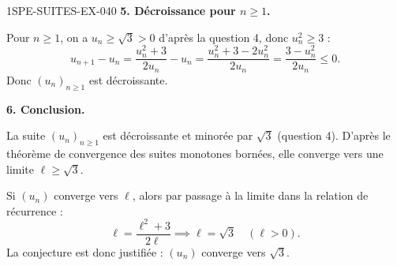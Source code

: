 \begin{corrige}{1SPE-SUITES-EX-040}
\textbf{5. Décroissance pour $n \geq 1$.}

Pour $n \geq 1$, on a $u_n \geq \sqrt{3} > 0$ d'après la question 4, donc $u_n^2 \geq 3$ :
\[
u_{n+1} - u_n = \frac{u_n^2 + 3}{2u_n} - u_n = \frac{u_n^2 + 3 - 2u_n^2}{2u_n} = \frac{3 - u_n^2}{2u_n} \leq 0.
\]
Donc $(u_n)_{n \geq 1}$ est décroissante.

\textbf{6. Conclusion.}


La suite $(u_n)_{n \geq 1}$ est décroissante et minorée par $\sqrt{3}$ (question 4). D'après le théorème de convergence des suites monotones bornées, elle converge vers une limite $\ell \geq \sqrt{3}$.

Si $(u_n)$ converge vers $\ell$, alors par passage à la limite dans la relation de récurrence :
\[
\ell = \frac{\ell^2 + 3}{2\ell} \implies \ell = \sqrt{3} \quad (\ell > 0).
\]
La conjecture est donc justifiée : $(u_n)$ converge vers $\sqrt{3}$.

\end{corrige}
